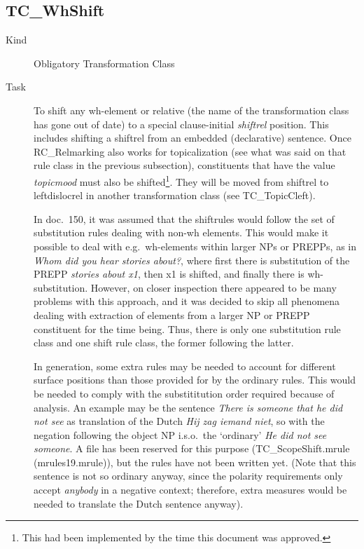 \newpage
\subsection{TC\_WhShift}
\begin{description}
\item[Kind] Obligatory Transformation Class
\item[Task] To shift any wh-element or relative (the name of the transformation 
class has gone out of date) to a special clause-initial {\em shiftrel\/} 
position. This includes shifting a shiftrel from an embedded (declarative) 
sentence. Once RC\_Relmarking also works for topicalization (see what was said 
on that rule class in the previous subsection), constituents that 
have the value {\em topicmood\/} must also be shifted\footnote{This had been 
implemented by the time this document was approved.}. They will be moved from 
shiftrel to leftdislocrel in another transformation class (see TC\_TopicCleft).

In doc.\ 150, it was assumed that the shiftrules would follow the set of 
substitution rules dealing with non-wh elements. This would make it possible to 
deal with e.g.\ wh-elements within larger NPs or PREPPs, as in {\em Whom did you 
hear stories about?\/}, where first there is substitution of the PREPP {\em 
stories about x1\/}, then x1 is shifted, and finally there is wh-substitution.
However, on closer inspection there appeared to be many problems with this 
approach, and it was decided to skip all phenomena dealing with extraction of 
elements from a larger NP or PREPP constituent for the time being. Thus, there 
is only one substitution rule class and one shift rule class, the former
following the latter.

In generation, some extra rules may be needed to account for different surface 
positions than those provided for by the ordinary rules. This would be needed 
to comply with the substititution order required because of analysis. 
An example may be the sentence {\em There 
is someone that he did not see\/} as translation of the Dutch {\em Hij zag 
iemand niet\/}, so with the negation following the object NP i.s.o.\ the 
`ordinary' {\em He did not see someone\/}. A file 
has been reserved for this purpose (TC\_ScopeShift.mrule (mrules19.mrule)), but
the rules have not been written yet. (Note that this sentence is not so 
ordinary anyway, 
since the polarity requirements only accept {\em anybody\/} in a negative 
context; therefore, extra measures would be needed to translate the Dutch 
sentence anyway).


\end{description}
